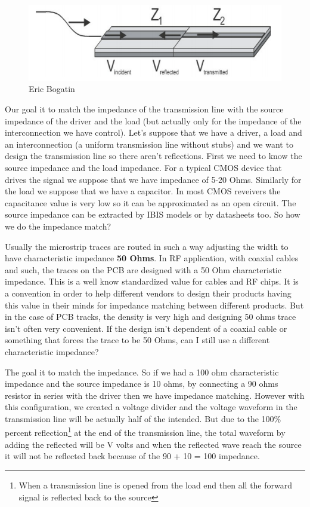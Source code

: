 \documentclass[final]{cubedoc}
\begin{document}
	
	\begin{figure}[h!]
		\centering
		\includegraphics[width = \textwidth, keepaspectratio, height=.3\textheight]{assets/impedance_matching.png}
		\caption{Eric Bogatin}
	\end{figure}
	
	Our goal it to match the impedance of the transmission line with the source impedance of the driver and the load (but actually only for the impedance of the interconnection we have control). Let's suppose that we have a driver, a load and an interconnection (a uniform transmission line without stubs) and we want to design the transmission line so there aren't reflections. First we need to know the source impedance and the load impedance. For a typical CMOS device that drives the signal we suppose that we have impedance of 5-20 Ohms. Similarly for the load we suppose that we have a capacitor. In most CMOS reveivers the capacitance value is very low so it can be approximated as an open circuit. The source impedance can be extracted by IBIS models or by datasheets too. So how we do the impedance match? 
	
	Usually the microstrip traces are routed in such a way adjusting the width to have characteristic impedance \textbf{50 Ohms}. In RF application, with coaxial cables and such, the traces on the PCB are designed with a 50 Ohm characteristic impedance. This is a well know standardized value for cables and RF chips. It is a convention in order to help different vendors to design their products having this value in their minds for impedance matching between different products. But in the case of PCB tracks, the density is very high and designing 50 ohms trace isn't often very convenient. If the design isn't dependent of a coaxial cable or something that forces the trace to be 50 Ohms, can I still use a different characteristic impedance?
	
	The goal it to match the impedance. So if we had a 100 ohm characteristic impedance and the source impedance is 10 ohms, by connecting a 90 ohms resistor in series with the driver then we have impedance matching. However with this configuration, we created a voltage divider and the voltage waveform in the transmission line will be actually half of the intended. But due to the 100\% percent reflection\footnote{When a transmission line is opened from the load end then all the forward signal is reflected back to the source} at the end of the transmission line, the total waveform by adding the reflected will be V volts and when the reflected wave reach the source it will not be reflected back because of the 90 + 10 = 100 impedance.
	
\end{document}
